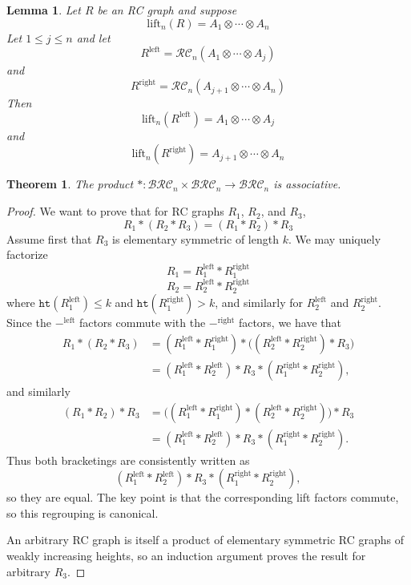 \documentclass{amsart}
\newtheorem{lemma}{Lemma}[subsection]
\newtheorem{theorem}{Theorem}[section]
\theoremstyle{definition}
\theoremstyle{remark}
\numberwithin{equation}{subsection}
\newcommand{\hr}{\mathtt{ht}}
\newcommand{\BRC}{\mathcal{BRC}}
\newcommand{\RC}{\mathcal{RC}}
\begin{document}
\begin{lemma}
  Let $R$ be an RC graph and suppose
$$\mathrm{lift}_n(R) = A_1\otimes\cdots\otimes A_n$$
Let $1\leq j\leq n$ and let 
$$R^{\mathrm{left}} = \RC_n(A_1\otimes\cdots \otimes A_j)$$
and
$$R^{\mathrm{right}} = \RC_n(A_{j+1}\otimes\cdots \otimes A_n)$$
Then
$$\mathrm{lift}_n(R^{\mathrm{left}}) = A_1\otimes\cdots \otimes A_j$$
and
$$\mathrm{lift}_n(R^{\mathrm{right}}) = A_{j+1}\otimes\cdots \otimes A_n$$
\end{lemma}

\begin{theorem}
The product $*:\BRC_n\times\BRC_n\to\BRC_n$ is associative.
\end{theorem}
\begin{proof}
We want to prove that for RC graphs $R_1$, $R_2$, and $R_3$,
$$R_1*(R_2*R_3) = (R_1*R_2)*R_3$$
Assume first that $R_3$ is elementary symmetric of length $k$. We may uniquely factorize 
$$R_1 = R_1^{\mathrm{left}}* R_1^{\mathrm{right}}$$
$$R_2 = R_2^{\mathrm{left}}* R_2^{\mathrm{right}}$$
where $\hr(R_1^{\mathrm{left}}) \leq k$ and $\hr(R_1^{\mathrm{right}}) > k$, and similarly for $R_2^{\mathrm{left}}$ and $R_2^{\mathrm{right}}$. 
Since the $-^{\mathrm{left}}$ factors commute with the $-^{\mathrm{right}}$ factors, we have that
\begin{align*}
R_1*(R_2*R_3)
&= (R_1^{\mathrm{left}}*R_1^{\mathrm{right}})*\big((R_2^{\mathrm{left}}*R_2^{\mathrm{right}})*R_3\big)\\
&= (R_1^{\mathrm{left}}*R_2^{\mathrm{left}})*R_3*(R_1^{\mathrm{right}}*R_2^{\mathrm{right}}),
\end{align*}
and similarly
\begin{align*}
(R_1*R_2)*R_3
&= \big((R_1^{\mathrm{left}}*R_1^{\mathrm{right}})*(R_2^{\mathrm{left}}*R_2^{\mathrm{right}})\big)*R_3\\
&= (R_1^{\mathrm{left}}*R_2^{\mathrm{left}})*R_3*(R_1^{\mathrm{right}}*R_2^{\mathrm{right}}).
\end{align*}
Thus both bracketings are consistently written as
$$
(R_1^{\mathrm{left}}*R_2^{\mathrm{left}})*R_3*(R_1^{\mathrm{right}}*R_2^{\mathrm{right}}),
$$
so they are equal. The key point is that the corresponding lift factors commute, so this regrouping is canonical.

An arbitrary RC graph is itself a product of elementary symmetric RC graphs of weakly increasing heights, so an induction argument proves the result for arbitrary $R_3$.
\end{proof}
\end{document}
